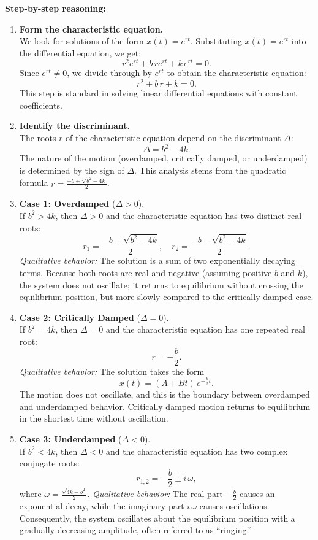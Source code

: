 \documentclass{article}
\begin{document}
\noindent
\textbf{Step-by-step reasoning:}

\begin{enumerate}
    \item \textbf{Form the characteristic equation.} \\
    We look for solutions of the form \(x(t) = e^{rt}\). Substituting \(x(t) = e^{rt}\) into the differential equation, we get:
    \[
    r^2 e^{rt} + b\, r e^{rt} + k\, e^{rt} = 0.
    \]
    Since \(e^{rt} \neq 0\), we divide through by \(e^{rt}\) to obtain the characteristic equation:
    \[
    r^2 + b\,r + k = 0.
    \]
    This step is standard in solving linear differential equations with constant coefficients.

    \item \textbf{Identify the discriminant.} \\
    The roots \(r\) of the characteristic equation depend on the discriminant \(\Delta\):
    \[
    \Delta = b^2 - 4k.
    \]
    The nature of the motion (overdamped, critically damped, or underdamped) is determined by the sign of \(\Delta\). This analysis stems from the quadratic formula \(r = \frac{-b \pm \sqrt{b^2 - 4k}}{2}\).

    \item \textbf{Case 1: Overdamped} (\(\Delta > 0\)). \\
    If \(b^2 > 4k\), then \(\Delta > 0\) and the characteristic equation has two distinct real roots:
    \[
    r_1 = \frac{-b + \sqrt{b^2 - 4k}}{2}, 
    \quad
    r_2 = \frac{-b - \sqrt{b^2 - 4k}}{2}.
    \]
    \textit{Qualitative behavior:} The solution is a sum of two exponentially decaying terms. Because both roots are real and negative (assuming positive \(b\) and \(k\)), the system does not oscillate; it returns to equilibrium without crossing the equilibrium position, but more slowly compared to the critically damped case.

    \item \textbf{Case 2: Critically Damped} (\(\Delta = 0\)). \\
    If \(b^2 = 4k\), then \(\Delta = 0\) and the characteristic equation has one repeated real root:
    \[
    r = -\frac{b}{2}.
    \]
    \textit{Qualitative behavior:} The solution takes the form
    \[
    x(t) = (A + Bt) \, e^{-\frac{b}{2} t}.
    \]
    The motion does not oscillate, and this is the boundary between overdamped and underdamped behavior. Critically damped motion returns to equilibrium in the shortest time without oscillation.

    \item \textbf{Case 3: Underdamped} (\(\Delta < 0\)). \\
    If \(b^2 < 4k\), then \(\Delta < 0\) and the characteristic equation has two complex conjugate roots:
    \[
    r_{1,2} = -\frac{b}{2} \pm i\,\omega,
    \]
    where \(\omega = \frac{\sqrt{4k - b^2}}{2}\). 
    \textit{Qualitative behavior:} The real part \(-\tfrac{b}{2}\) causes an exponential decay, while the imaginary part \(i\,\omega\) causes oscillations. Consequently, the system oscillates about the equilibrium position with a gradually decreasing amplitude, often referred to as ``ringing.''

\end{enumerate}
\end{document}
